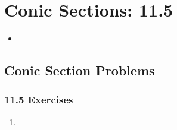 \chapter{Conic Sections: 11.5}

\begin{itemize}
  \item

\end{itemize}

\section{Conic Section Problems}

\subsection{11.5 Exercises}
\begin{enumerate}[itemsep=3em]
  \item
\end{enumerate}
